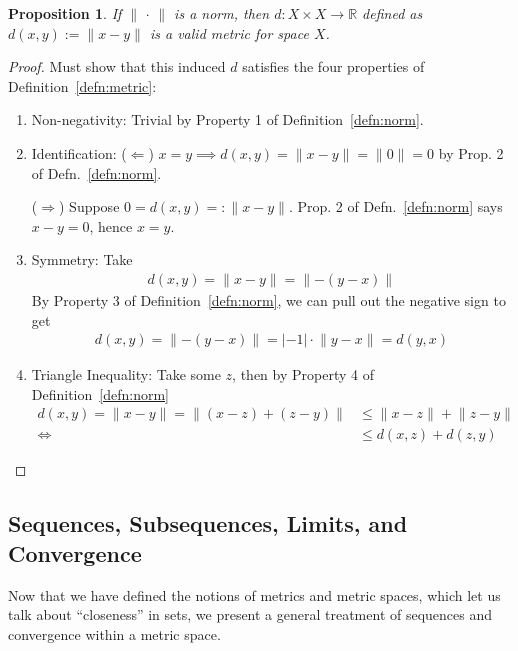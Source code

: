 \documentclass[12pt]{book}
\numberwithin{equation}{section} %
\theoremstyle{plain}
\newtheorem{prop}[thm]{Proposition}
\theoremstyle{definition}
\theoremstyle{remark}
\newcommand{\R}{\mathbb{R}}
\begin{document}
\begin{prop}
If $\lVert \,\cdot\,\rVert$ is a norm, then $d:X \times X\rightarrow \R$
defined as $d(x,y):=\lVert x-y\rVert$ is a valid metric for space $X$.
\end{prop}
\begin{proof}
Must show that this induced $d$ satisfies the four properties of
Definition~\ref{defn:metric}:
\begin{enumerate}
  \item Non-negativity: Trivial by Property 1 of
    Definition~\ref{defn:norm}.
  \item Identification: ($\Leftarrow$) $x=y\implies d(x,y)=\lVert
    x-y\rVert=\lVert 0\rVert=0$ by Prop. 2 of Defn.~\ref{defn:norm}.

    ($\Rightarrow$) Suppose $0 = d(x,y) =: \lVert x-y\rVert$. Prop. 2
    of Defn.~\ref{defn:norm} says $x-y=0$, hence $x=y$.

  \item Symmetry: Take
    \begin{align*}
      d(x,y)= \lVert x-y\rVert= \lVert -(y-x)\rVert
    \end{align*}
    By Property 3 of
    Definition~\ref{defn:norm}, we can pull out the negative sign to get
    \begin{align*}
      d(x,y)= \lVert -(y-x)\rVert =|-1| \cdot \lVert y-x\rVert = d(y,x)
    \end{align*}
  \item Triangle Inequality: Take some $z$, then by Property 4 of
    Definition~\ref{defn:norm}
    \begin{align*}
      d(x,y) = \lVert x-y\rVert
      = \lVert (x-z)+ (z-y) \rVert
      &\leq \lVert x-z\rVert +\lVert z-y\rVert
      \\
      \Leftrightarrow\qquad
      &\leq d(x,z) + d(z,y)
    \end{align*}
\end{enumerate}
\end{proof}







\clearpage
\subsection{Sequences, Subsequences, Limits, and Convergence}

Now that we have defined the notions of metrics and metric spaces, which
let us talk about ``closeness'' in sets, we present a general treatment
of sequences and convergence within a metric space.
\end{document}
